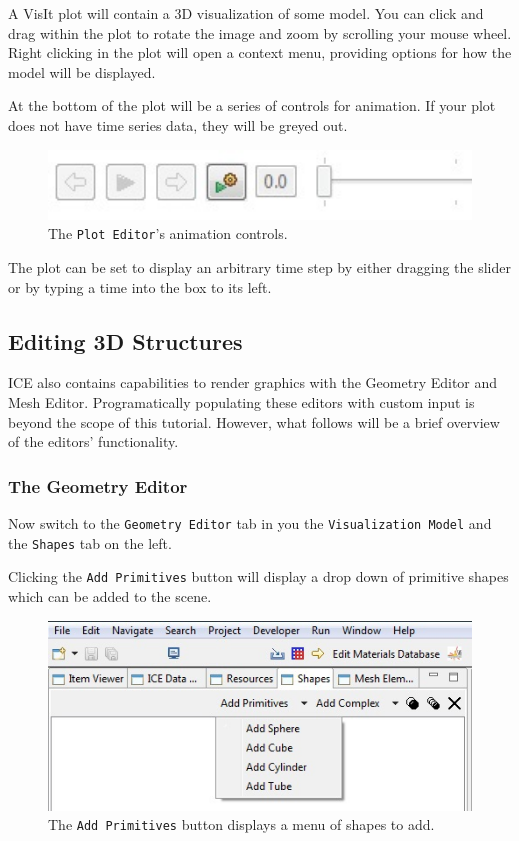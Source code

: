 A VisIt plot will contain a 3D visualization of some model. You can click and
drag within the plot to rotate the image and zoom by scrolling your mouse wheel.
Right clicking in the plot will open a context menu, providing options for how
the model will be displayed.

At the bottom of the plot will be a series of controls for animation. If your
plot does not have time series data, they will be greyed out. 

\begin{figure}[!h]
\includegraphics[width=12cm]{images/TimeSliderWidget} 
\centering
\caption{The \texttt{Plot Editor}'s animation controls.}
\label{fig:timesliderwidget}
\end{figure}

The plot can be set to display an arbitrary time step by either dragging the
slider or by typing a time into the box to its left.

\subsection{Editing 3D Structures}

ICE also contains capabilities to render graphics with the Geometry Editor and
Mesh Editor. Programatically populating these editors with custom input is
beyond the scope of this tutorial. However, what follows will be a brief
overview of the editors' functionality.

\subsubsection{The Geometry Editor}

Now switch to the \texttt{Geometry Editor} tab in you the \texttt{Visualization
Model} and the \texttt{Shapes} tab on the left.

Clicking the \texttt{Add Primitives} button will display a drop down of
primitive shapes which can be added to the scene.

\begin{figure}[!h]
\includegraphics[width=12cm]{images/AddPrimitiveShape}
\centering
\caption{The \texttt{Add Primitives} button displays a menu of shapes to add.}
\label{fig:addprimitiveshape}
\end{figure}

